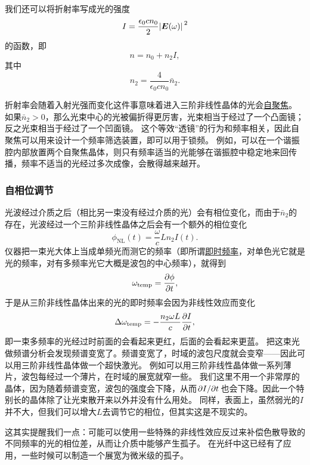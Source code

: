 \documentclass[UTF8, a4paper]{ctexart}
\newcommand{\concept}[1]{\underline{#1}}
\begin{document}
我们还可以将折射率写成光的强度
\begin{equation}
    I = \frac{\epsilon_0 c n_0}{2} \abs*{\vb*{E}(\omega)}^2
\end{equation}
的函数，即
\begin{equation}
    n = n_0 + n_2 I,
\end{equation}
其中
\begin{equation}
    n_2 = \frac{4}{\epsilon_0 c n_0} \bar{n}_2.
\end{equation}

折射率会随着入射光强而变化这件事意味着进入三阶非线性晶体的光会\concept{自聚焦}。
如果$\bar{n}_2 > 0$，那么光束中心的光被偏折得更厉害，光束相当于经过了一个凸面镜；反之光束相当于经过了一个凹面镜。
这个等效“透镜”的行为和频率相关，因此自聚焦可以用来设计一个频率筛选装置，即可以用于锁频。
例如，可以在一个谐振腔内部放置两个自聚焦晶体，则只有频率适当的光能够在谐振腔中稳定地来回传播，频率不适当的光经过多次成像，会散得越来越开。

\subsubsection{自相位调节}

光波经过介质之后（相比另一束没有经过介质的光）会有相位变化，而由于$\bar{n}_2$的存在，光波经过一个三阶非线性晶体之后会有一个额外的相位变化
\begin{equation}
    \phi_\text{NL}(t) = \frac{\omega}{c} L n_2 I(t).
\end{equation}
仪器把一束光大体上当成单频光而测它的频率（即所谓\concept{即时频率}，对单色光它就是光的频率，对有多频率光它大概是波包的中心频率），就得到
\[
    \omega_\text{temp} = \pdv{\phi}{t},
\]
于是从三阶非线性晶体出来的光的即时频率会因为非线性效应而变化
\begin{equation}
    \Delta \omega_\text{temp} = - \frac{n_2 \omega L}{c} \pdv{I}{t},
    \label{eq:temp-phase-change}
\end{equation}
即一束多频率的光经过时前面的会看起来更红，后面的会看起来更蓝。
把这束光做频谱分析会发现频谱变宽了。频谱变宽了，时域的波包尺度就会变窄——因此可以用三阶非线性晶体做一个超快激光。
例如可以用三阶非线性晶体做一系列薄片，波包每经过一个薄片，在时域的展宽就窄一些。
我们这里不用一个非常厚的晶体，因为随着频谱变宽，波包的强度会下降，从而$\pdv*{I}{t}$也会下降。因此一个特别长的晶体除了让光束散开来以外并没有什么用处。
同样，表面上，虽然弱光的$I$并不大，但我们可以增大$L$去调节它的相位，但其实这是不现实的。

这其实提醒我们一点：可能可以使用一些特殊的非线性效应反过来补偿色散导致的不同频率的光的相位差，从而让介质中能够产生孤子。
在光纤中这已经有了应用，一些时候可以制造一个展宽为微米级的孤子。
\end{document}
